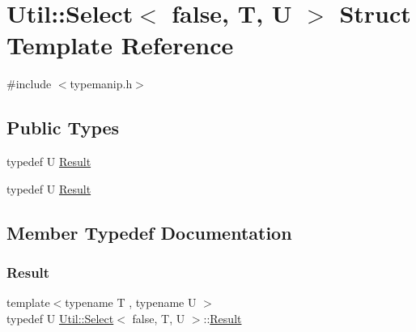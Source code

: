 \hypertarget{structUtil_1_1Select_3_01false_00_01T_00_01U_01_4}{}\section{Util\+:\+:Select$<$ false, T, U $>$ Struct Template Reference}
\label{structUtil_1_1Select_3_01false_00_01T_00_01U_01_4}


{\ttfamily \#include $<$typemanip.\+h$>$}

\subsection*{Public Types}
\begin{DoxyCompactItemize}
\item 
typedef U \mbox{\hyperlink{structUtil_1_1Select_3_01false_00_01T_00_01U_01_4_a0fae7c144e474e3297046018b97cd287}{Result}}
\item 
typedef U \mbox{\hyperlink{structUtil_1_1Select_3_01false_00_01T_00_01U_01_4_a0fae7c144e474e3297046018b97cd287}{Result}}
\end{DoxyCompactItemize}


\subsection{Member Typedef Documentation}
\mbox{\label{structUtil_1_1Select_3_01false_00_01T_00_01U_01_4_a0fae7c144e474e3297046018b97cd287}} 
\subsubsection{\texorpdfstring{Result}{Result}\hspace{0.1cm}{\footnotesize\ttfamily [1/2]}}
{\footnotesize\ttfamily template$<$typename T , typename U $>$ \\
typedef U \mbox{\hyperlink{structUtil_1_1Select}{Util\+::\+Select}}$<$ false, T, U $>$\+::\mbox{\hyperlink{structUtil_1_1Select_3_01false_00_01T_00_01U_01_4_a0fae7c144e474e3297046018b97cd287}{Result}}}

\mbox{\label{structUtil_1_1Select_3_01false_00_01T_00_01U_01_4_a0fae7c144e474e3297046018b97cd287}} 

